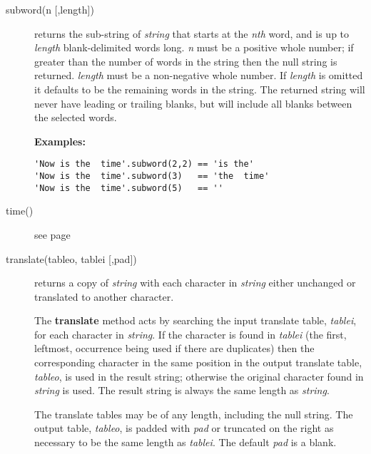 \begin{description}
\item[subword(n [,length{]})]\label{refsubword}
returns the sub-string of \emph{string} that starts at the
\emph{n}\emph{th} word, and is up to \emph{length} blank-delimited
words long.
\emph{n} must be a positive whole number; if greater than the number
of words in the string then the null string is returned.
\emph{length} must be a non-negative whole number.
If \emph{length} is omitted it defaults to be the remaining words
in the string.
The returned string will never have leading or trailing blanks, but
will include all blanks between the selected words.
 
\textbf{Examples:}
\begin{lstlisting}
'Now is the  time'.subword(2,2) == 'is the'
'Now is the  time'.subword(3)   == 'the  time'
'Now is the  time'.subword(5)   == ''
\end{lstlisting}

\item[time()] see page \pageref{refrexxtime}
\index{,}
\item[translate(tableo, tablei [,pad{]})]\label{reftrans}
returns a copy of \emph{string} with each character in
\emph{string} either unchanged or translated to another character.
 
The \textbf{translate} method acts by searching the input translate
table, \emph{tablei}, for each character in \emph{string}.
If the character is found in \emph{tablei} (the first, leftmost,
occurrence being used if there are duplicates) then the corresponding
character in the same position in the output translate table,
\emph{tableo}, is used in the result string; otherwise the original
character found in \emph{string} is used.
The result string is always the same length as \emph{string}.
 
The translate tables may be of any length, including the null string.
The output table, \emph{tableo}, is padded with \emph{pad} or
truncated on the right as necessary to be the same length as
\emph{tablei}.
The default \emph{pad} is a blank.
 

\end{description}

